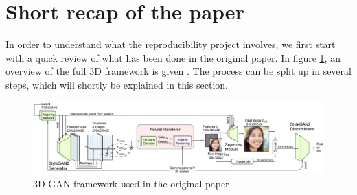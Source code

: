 \section{Short recap of the paper}

In order to understand what the reproducibility project involves, we first start with a quick review of what has been done in the original paper. In figure \ref{fig:gan_framework}, an overview of the full 3D framework is given \cite{chan2022efficient}. The process can be split up in several steps, which will shortly be explained in this section.

\begin{figure}[H]
\centering
  \centering
  \includegraphics[width=1\linewidth]{3D GAN network.jpg}
  \caption{3D GAN framework used in the original paper \cite{chan2022efficient}}
  \label{fig:gan_framework}
\end{figure}

